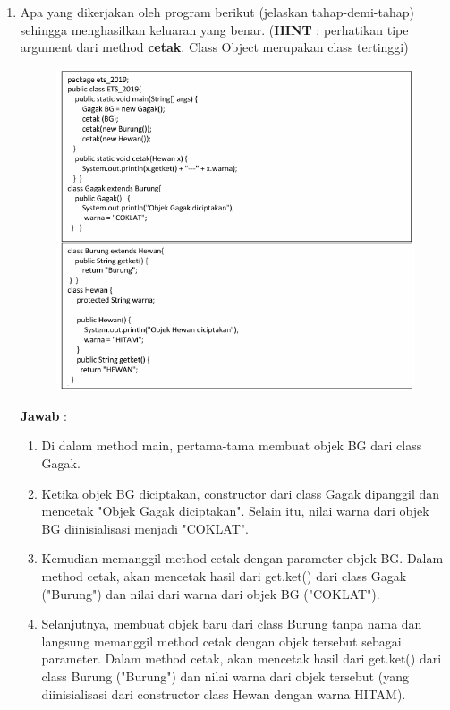 \documentclass[a4paper, 12pt]{article}
\newcommand{\ans}{\textbf{Jawab} :}
\begin{document}
\begin{enumerate}
        \newpage
        \item Apa yang dikerjakan oleh program berikut (jelaskan tahap-demi-tahap) sehingga menghasilkan keluaran yang benar. (\textbf{HINT} : perhatikan tipe argument dari method  \textbf{cetak}.  Class Object  merupakan class tertinggi)
        \begin{figure}[h]
            \centering
            \includegraphics[width=1\linewidth]{No3.png}
        \end{figure}

        \ans
        \begin{enumerate}[label=\textbullet]
            \item Di dalam method main, pertama-tama membuat objek BG dari class Gagak.

            \item Ketika objek BG diciptakan, constructor dari class Gagak dipanggil dan mencetak "Objek Gagak diciptakan". Selain itu, nilai warna dari objek BG diinisialisasi menjadi "COKLAT".

            \item  Kemudian memanggil method cetak dengan parameter objek BG. Dalam method cetak, akan mencetak hasil dari get.ket() dari class Gagak ("Burung") dan nilai dari warna dari objek BG ("COKLAT").

            \item Selanjutnya, membuat objek baru dari class Burung tanpa nama dan langsung memanggil method cetak dengan objek tersebut sebagai parameter. Dalam method cetak, akan mencetak hasil dari get.ket() dari class Burung ("Burung") dan nilai warna dari objek tersebut (yang diinisialisasi dari constructor class Hewan dengan warna HITAM).


\end{enumerate}
\end{enumerate}
\end{document}
